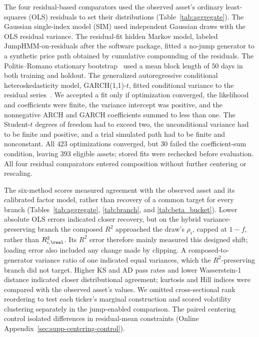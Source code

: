 


The four residual-based comparators used the observed asset's
ordinary least-squares (OLS) residuals to set their distributions
(Table~\ref{tab:aggregate}). The Gaussian single-index model (SIM)
used independent Gaussian draws with the OLS residual variance. The
residual-fit hidden Markov model, labeled JumpHMM-on-residuals after
the software package, fitted a no-jump generator to a synthetic price
path obtained by cumulative compounding of the residuals. The
Politis--Romano stationary bootstrap~\cite{politisRomano1994} used a
mean block length of $50$ days in both training and holdout. The
generalized autoregressive conditional heteroskedasticity model,
GARCH(1,1)-$t$, fitted conditional variance to the residual
series~\cite{bollerslev1986}. We accepted a fit only if optimization
converged, the likelihood and coefficients were finite, the variance
intercept was positive, and the nonnegative ARCH and GARCH
coefficients summed to less than one. The Student-$t$ degrees of
freedom had to exceed two, the unconditional variance had to be finite
and positive, and a trial simulated path had to be finite and
nonconstant. All $423$ optimizations converged, but $30$ failed the
coefficient-sum condition, leaving $393$ eligible assets; stored fits
were rechecked before evaluation. All four residual
comparators entered composition without further centering or
rescaling.

The six-method scores measured agreement with the observed asset and
its calibrated factor model, rather than recovery of a common target
for every branch (Tables~\ref{tab:aggregate}, \ref{tab:branch}, and
\ref{tab:beta_bucket}). Lower absolute OLS errors indicated closer
recovery, but on the hybrid variance-preserving branch the composed
$R^2$ approached the draw's $\rho_i$, capped at $1-f$, rather than
$R^2_{i,\real}$. Its $R^2$ error therefore mainly measured this
designed shift; loading error also included any change made by
clipping. A composed-to-generator variance ratio of one indicated
equal variances, which the $R^2$-preserving branch did not target.
Higher KS and AD pass rates and lower Wasserstein-1 distance indicated
closer distributional agreement; kurtosis and Hill indices were
compared with the observed asset's values. We omitted cross-sectional
rank reordering to test each ticker's marginal construction and
scored volatility clustering separately in the jump-enabled comparison.
The paired centering control isolated differences in residual-mean
constraints (Online Appendix~\ref{sec:supp-centering-control}).


